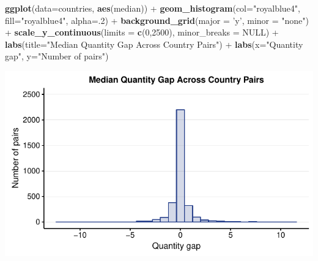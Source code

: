 \documentclass[10pt,]{article}
\newenvironment{Shaded}{\begin{snugshade}}{\end{snugshade}}
\newcommand{\KeywordTok}[1]{\textcolor[rgb]{0.13,0.29,0.53}{\textbf{{#1}}}}
\newcommand{\DataTypeTok}[1]{\textcolor[rgb]{0.13,0.29,0.53}{{#1}}}
\newcommand{\DecValTok}[1]{\textcolor[rgb]{0.00,0.00,0.81}{{#1}}}
\newcommand{\StringTok}[1]{\textcolor[rgb]{0.31,0.60,0.02}{{#1}}}
\newcommand{\OtherTok}[1]{\textcolor[rgb]{0.56,0.35,0.01}{{#1}}}
\newcommand{\NormalTok}[1]{{#1}}
\begin{document}
\begin{Shaded}
\begin{Highlighting}[]
\KeywordTok{ggplot}\NormalTok{(}\DataTypeTok{data=}\NormalTok{countries, }\KeywordTok{aes}\NormalTok{(median)) +}
\StringTok{  }\KeywordTok{geom_histogram}\NormalTok{(}\DataTypeTok{col=}\StringTok{"royalblue4"}\NormalTok{,}
                 \DataTypeTok{fill=}\StringTok{"royalblue4"}\NormalTok{,}
                 \DataTypeTok{alpha=}\NormalTok{.}\DecValTok{2}\NormalTok{) +}
\StringTok{  }\KeywordTok{background_grid}\NormalTok{(}\DataTypeTok{major =} \StringTok{'y'}\NormalTok{, }\DataTypeTok{minor =} \StringTok{"none"}\NormalTok{) +}
\StringTok{  }\KeywordTok{scale_y_continuous}\NormalTok{(}\DataTypeTok{limits =} \KeywordTok{c}\NormalTok{(}\DecValTok{0}\NormalTok{,}\DecValTok{2500}\NormalTok{), }\DataTypeTok{minor_breaks =} \OtherTok{NULL}\NormalTok{) +}
\StringTok{  }\KeywordTok{labs}\NormalTok{(}\DataTypeTok{title=}\StringTok{"Median Quantity Gap Across Country Pairs"}\NormalTok{) +}
\StringTok{  }\KeywordTok{labs}\NormalTok{(}\DataTypeTok{x=}\StringTok{"Quantity gap"}\NormalTok{, }\DataTypeTok{y=}\StringTok{"Number of pairs"}\NormalTok{)}
\end{Highlighting}
\end{Shaded}

\begin{center}\includegraphics{Figs/quantity_pairs-2} \end{center}
\end{document}
